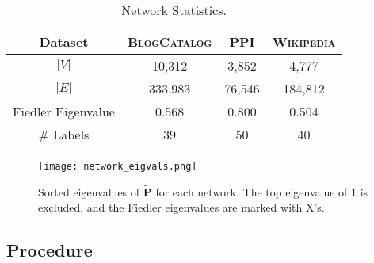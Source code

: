 \documentclass[sigconf]{acmart}
\newcommand{\mbf}[1]{\mathbf{#1}}
\begin{document}
\begin{table}[t]
\begin{center}
\begin{tabular}{c|c|c|c}
\hline
\hline
Dataset   & \textsc{BlogCatalog} & \textsc{PPI}  & \textsc{Wikipedia} \\ \hline
$|V|$       & 10,312      & 3,852            & 4,777     \\ \hline
$|E|$       & 333,983     & 76,546           & 184,812   \\ \hline
Fiedler Eigenvalue & 0.568          & 0.800                  & 0.504        \\ \hline
\# Labels & 39          & 50                  & 40        \\ \hline
\hline
\end{tabular}
\smallskip
\caption{Network Statistics.}
\label{dataset_info_table}
\end{center}
\end{table}

\begin{figure} 
\begin{center}
\texttt{[image: network\_eigvals.png]}
\end{center}
\caption{Sorted eigenvalues of $\mbf{\tilde{P}}$ for each network.
The top eigenvalue of 1 is excluded, and the Fiedler eigenvalues are marked with X's.}
\label{prob_eigvals}
\end{figure}

\subsection{Procedure}\label{sec:proc}
\end{document}
